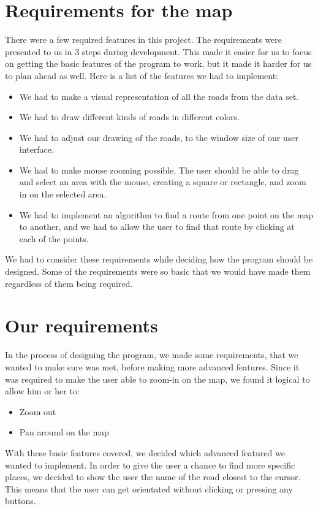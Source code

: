 \section{Requirements for the map}
\label{BG-R}
There were a few required features in this project. The requirements were
presented to us in 3 steps during development. This made it easier for us to
focus on getting the basic features of the program to work, but it made it
harder for us to plan ahead as well. 
Here is a list of the features we had to implement: 
\begin{itemize}
  \item We had to make a visual representation of all the roads from the
  data set.
  \item We had to draw different kinds of roads in different colors.
  \item We had to adjust our drawing of the roads, to the window size of our
  user interface.
  \item We had to make mouse zooming possible.  The user should be able to drag
  and select an area with the mouse, creating a square or rectangle, and zoom in on the
  selected area.
  \item We had to implement an algorithm to find a route from one point on the
  map to another, and we had to allow the user to find that route by clicking at each
  of the points.
\end{itemize}
We had to consider these requirements while
deciding how the program should be designed. Some of the
requirements were so basic that we would have made them regardless
of them being required.

\section{Our requirements}
In the process of designing the program, we made some requirements, that we
wanted to make sure was met, before making more advanced features. Since it was
required to make the user able to zoom-in on the map, we found it logical to
allow him or her to:
\begin{itemize}
  \item Zoom out
  \item Pan around on the map
\end{itemize}

With these basic features covered, we decided which advanced featured we wanted
to implement. In order to give the user a chance to find more specific places, we
decided to show the user the name of the road closest to the cursor. This means
that the user can get orientated without clicking or pressing any buttons. 

